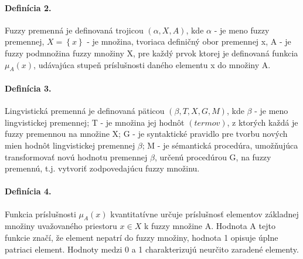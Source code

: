 
\paragraph*{Definícia 2. }
Fuzzy premenná je definovaná trojicou $\left( \alpha, X, A \right) $, kde 
$\alpha $ - je meno fuzzy premennej, 
 $X=\left\lbrace x \right\rbrace$ - je množina, tvoriaca definičný obor premennej x, 
 A - je fuzzy podmnožina fuzzy množiny X, pre každý prvok ktorej je definovaná funkcia $\mu_A\left( x\right)$, udávajúca stupeň príslušnosti daného elementu x do množiny A.  \cite{levashenkoProj}

\paragraph*{Definícia 3.}
Lingvistická premenná je definovaná päticou 
$
\left(
\beta, T, X, G, M
 \right) 
$, kde 
$\beta$ - je meno lingvistickej premennej; 
T - je množina jej hodnôt $\left( termov \right) $, z ktorých každá je fuzzy premennou na množine X;
G - je syntaktické pravidlo pre tvorbu nových mien hodnôt lingvistickej premennej $\beta$;
M - je sémantická procedúra, umožňujúca transformovať novú hodnotu premennej $\beta$, určenú procedúrou G, na fuzzy premennú, t.j. vytvoriť zodpovedajúcu fuzzy množinu. \cite{levashenkoProj}


\paragraph*{Definícia 4.}
Funkcia príslušnosti $\mu_A\left( x\right)$ kvantitatívne určuje príslušnosť elementov základnej množiny uvažovaného priestoru $x \in X$ k fuzzy množine A. Hodnota A tejto funkcie značí, že element nepatrí do fuzzy množiny, hodnota 1 opisuje úplne patriaci element. Hodnoty medzi 0 a 1 charakterizujú neurčito zaradené elementy. \cite{levashenkoProj, Kaufman1985, Klir1995, Navara2011}

